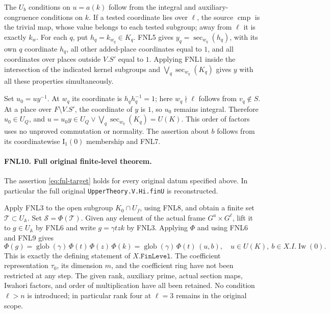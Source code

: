 The \(U_b\) conditions on \(u=a(k)\) follow from the integral and
auxiliary-congruence conditions on \(k\).  If a tested coordinate
lies over \(\ell\), the source \(\operatorname{cmp}\) is the
trivial map, whose value belongs to each tested subgroup; away from
\(\ell\) it is exactly \(k_w\).  For each \(q\), put
\(h_q=k_{w_q}\in K_q\).  FNL5 gives
\(y_q=\operatorname{sec}_{w_q}(h_q)\), with its own \(q\) coordinate
\(h_q\), all other added-place coordinates equal to \(1\), and
all coordinates over places outside \(V.S'\) equal to \(1\).
Applying FNL1 inside the intersection of the indicated kernel
subgroups and \(\bigvee_q\operatorname{sec}_{w_q}(K_q)\) gives
\(y\) with all these properties simultaneously.

Set \(u_0=uy^{-1}\).  At \(w_q\) its coordinate is
\(h_qh_q^{-1}=1\); here \(w_q\nmid\ell\) follows from
\(v_q\notin S\).  At a place over \(F\setminus V.S'\), the
coordinate of \(y\) is \(1\), so \(u_0\) remains integral.
Therefore \(u_0\in U_Q\), and
\(u=u_0y\in U_Q\vee\bigvee_q\operatorname{sec}_{w_q}(K_q)=U(K)\).
This order of factors uses no unproved commutation or normality.
The assertion about \(b\) follows from its coordinatewise
\(\mathrm I_1(0)\) membership and FNL7.

\paragraph{FNL10. Full original finite-level theorem.}
\label{claim:FNL10}
The assertion \eqref{eq:fnl-target} holds for every original datum
specified above.  In particular the full original
\texttt{UpperTheory.V.Hi.finU} is reconstructed.

Apply FNL3 to the open subgroup \(K_0\cap U_f\), using FNL8,
and obtain a finite set \(\mathcal T\subset U_{\mathbb A}\).
Set \(\mathcal S=\Phi(\mathcal T)\).  Given any element of the
actual frame \(G^a\times G^\ell\), lift it to \(g\in U_{\mathbb A}\)
by FNL6 and write \(g=\gamma t z k\) by FNL3.  Applying \(\Phi\)
and using FNL6 and FNL9 gives
\[
 \Phi(g)=\operatorname{glob}(\gamma)\,\Phi(t)\,\Phi(z)\,\Phi(k)
         =\operatorname{glob}(\gamma)\,\Phi(t)\,(u,b),
 \quad u\in U(K),\ b\in X.I.\operatorname{Iw}(0).
\]
This is exactly the defining statement of \(X.\texttt{FinLevel}\).
The coefficient representation \(\tau _0\), its dimension \(m\),
and the coefficient ring have not been restricted at any step.
The given rank, auxiliary prime, actual section maps, Iwahori factors,
and order of multiplication have all been retained.  No condition
\(\ell>n\) is introduced; in particular rank four at \(\ell=3\)
remains in the original scope.

